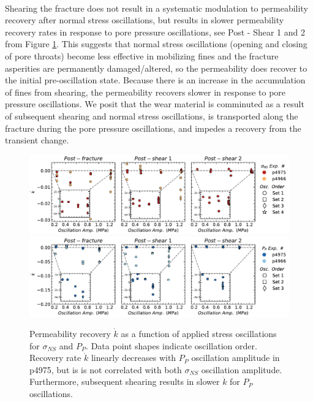 \documentclass[letterpaper,10pt]{article}
\begin{document}
\paragraph{}
Shearing the fracture does not result in a systematic modulation to permeability recovery after normal stress oscillations, but results in slower permeability recovery rates in response to pore pressure oscillations, see Post - Shear 1 and 2 from Figure \ref{fig:k_recov}. This suggests that normal stress oscillations (opening and closing of pore throats) become less effective in mobilizing fines and the fracture asperities are permanently damaged/altered, so the permeability does recover to the initial pre-oscillation state. Because there is an increase in the accumulation of fines from shearing, the permeability recovers slower in response to pore pressure oscillations. We posit that the wear material is comminuted as a result of subsequent shearing and normal stress oscillations, is transported along the fracture during the pore pressure oscillations, and impedes a recovery from the transient change.

\clearpage

\begin{figure}[ht]
	\centering
	\includegraphics[width=1\columnwidth]{k_recov_amp_NS}
	\includegraphics[width=1\columnwidth]{k_recov_amp_PP}
	\caption{Permeability recovery $ \dot k $ as a function of applied stress oscillations for $ \sigma_{NS} $ and $ P_P $. Data point shapes indicate oscillation order. Recovery rate $ \dot k $ linearly decreases with $ P_P $ oscillation amplitude in p4975, but is is not correlated with both $ \sigma_{NS} $ oscillation amplitude. Furthermore, subsequent shearing results in slower $ \dot k $ for $ P_P $ oscillations. }
	\label{fig:k_recov}
\end{figure}
\clearpage
\end{document}
